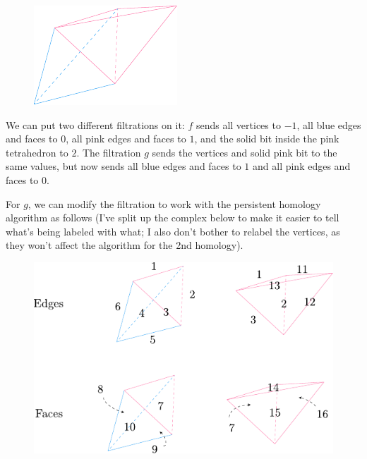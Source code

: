 \documentclass[twoside,10pt]{article}
\begin{document}
\begin{figure}[H]
	\centering
	\includegraphics[scale=1.5]{fig/1b.pdf}
\end{figure}

We can put two different filtrations on it: $f$ sends all vertices to $-1$, all blue edges and faces to $0$, all pink edges and faces to $1$, and the solid bit inside the pink tetrahedron to $2$. The filtration $g$ sends the vertices and solid pink bit to the same values, but now sends all blue edges and faces to $1$ and all pink edges and faces to $0$.

For $g$, we can modify the filtration to work with the persistent homology algorithm as follows (I've split up the complex below to make it easier to tell what's being labeled with what; I also don't bother to relabel the vertices, as they won't affect the algorithm for the 2nd homology).

\begin{figure}[H]
	\centering
	\includegraphics[scale=1.4]{fig/1c.pdf}
\end{figure}
\end{document}
